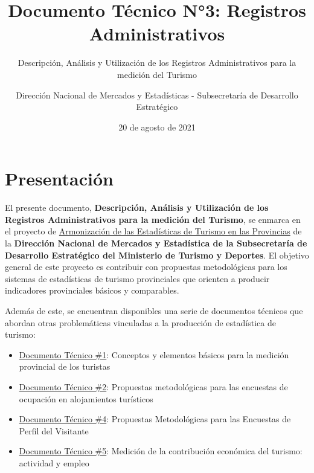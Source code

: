\documentclass[
]{book}
\title{Documento Técnico N°3: Registros Administrativos}
\subtitle{Descripción, Análisis y Utilización de los Registros Administrativos para la medición del Turismo}
\author{Dirección Nacional de Mercados y Estadísticas - Subsecretaría de Desarrollo Estratégico}
\date{20 de agosto de 2021}
\let\oldmaketitle\maketitle
\begin{document}
\maketitle


\newpage

\let\maketitle\oldmaketitle
\maketitle

{
\setcounter{tocdepth}{1}
\tableofcontents
}
\hypertarget{presentaciuxf3n}{%
\chapter*{Presentación}\label{presentaciuxf3n}}

El presente documento, \textbf{Descripción, Análisis y Utilización de los Registros Administrativos para la medición del Turismo}, se enmarca en el proyecto de \href{https://armonizacion.yvera.tur.ar//}{Armonización de las Estadísticas de Turismo en las Provincias} de la \textbf{Dirección Nacional de Mercados y Estadística de la Subsecretaría de Desarrollo Estratégico del Ministerio de Turismo y Deportes}. El objetivo general de este proyecto es contribuir con propuestas metodológicas para los sistemas de estadísticas de turismo provinciales que orienten a producir indicadores provinciales básicos y comparables.

Además de este, se encuentran disponibles una serie de documentos técnicos que abordan otras problemáticas vinculadas a la producción de estadística de turismo:

\begin{itemize}
\item
  \href{https://dnme-minturdep.github.io/DT1_medicion_turismo/}{Documento Técnico \#1}: Conceptos y elementos básicos para la medición provincial de los turistas
\item
  \href{https://dnme-minturdep.github.io/DT2_encuestas/}{Documento Técnico \#2}: Propuestas metodológicas para las encuestas de ocupación en alojamientos turísticos
\item
  \href{https://dnme-minturdep.github.io/DT4_perfiles/}{Documento Técnico \#4}: Propuestas Metodológicas para las Encuestas de Perfil del Visitante
\item
  \href{https://dnme-minturdep.github.io/DT5_actividad_empleo/}{Documento Técnico \#5}: Medición de la contribución económica del turismo: actividad y empleo
\end{itemize}
\end{document}
